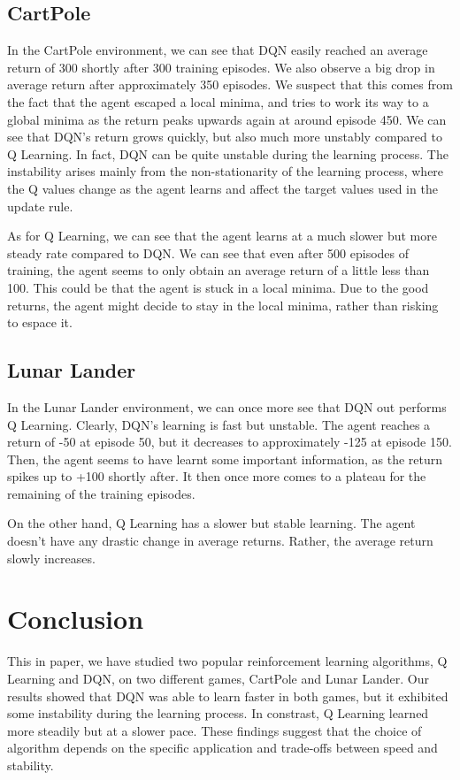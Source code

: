 \documentclass{article}
\begin{document}
\subsection{CartPole}
In the CartPole environment, we can see that DQN easily reached an average
return of 300 shortly after 300 training episodes. We also observe a big drop
in average return after approximately 350 episodes. We suspect that this comes
from the fact that the agent escaped a local minima, and tries to work its way
to a global minima as the return peaks upwards again at around episode 450. We
can see that DQN's return grows quickly, but also much more unstably compared
to Q Learning. In fact, DQN can be quite unstable during the learning process.
The instability arises mainly from the non-stationarity of the learning
process, where the Q values change as the agent learns and affect the target
values used in the update rule.

As for Q Learning, we can see that the agent learns at a much slower but more
steady rate compared to DQN. We can see that even after 500 episodes of
training, the agent seems to only obtain an average return of a little less
than 100. This could be that the agent is stuck in a local minima. Due to the
good returns, the agent might decide to stay in the local minima, rather than
risking to espace it.

\subsection{Lunar Lander}
In the Lunar Lander environment, we can once more see that DQN out performs Q
Learning. Clearly, DQN's learning is fast but unstable. The agent reaches a
return of -50 at episode 50, but it decreases to approximately -125 at episode
150. Then, the agent seems to have learnt some important information, as the
return spikes up to +100 shortly after. It then once more comes to a plateau
for the remaining of the training episodes.

On the other hand, Q Learning has a slower but stable learning. The agent
doesn't have any drastic change in average returns. Rather, the average return
slowly increases.

\section{Conclusion}
This in paper, we have studied two popular reinforcement learning algorithms, Q
Learning and DQN, on two different games, CartPole and Lunar Lander. Our
results showed that DQN was able to learn faster in both games, but it
exhibited some instability during the learning process. In constrast, Q
Learning learned more steadily but at a slower pace. These findings suggest
that the choice of algorithm depends on the specific application and trade-offs
between speed and stability.
\end{document}
